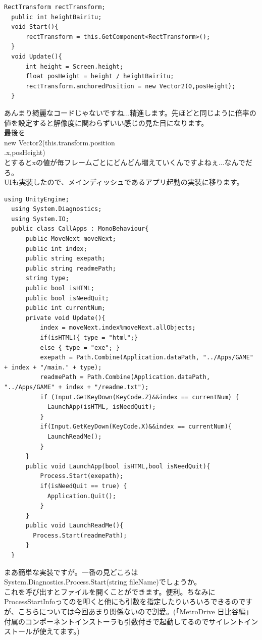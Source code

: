 \documentclass[b5paper,9pt,platex,dvipdfmx]{jsarticle}
\begin{document}
\begin{multicols*}{3}
\begin{lstlisting}[caption=SetInfoTex.cs]
  RectTransform rectTransform;
  public int heightBairitu;
  void Start(){
      rectTransform = this.GetComponent<RectTransform>();
  }
  void Update(){
      int height = Screen.height;
      float posHeight = height / heightBairitu;
      rectTransform.anchoredPosition = new Vector2(0,posHeight);
  }
\end{lstlisting}
あんまり綺麗なコードじゃないですね...精進します。先ほどと同じように倍率の値を設定すると解像度に関わらずいい感じの見た目になります。\\
最後を\\new Vector2(this.transform.position\\.x,posHeight)\\
とするとxの値が毎フレームごとにどんどん増えていくんですよねぇ...なんでだろ。\\
UIも実装したので、メインディッシュであるアプリ起動の実装に移ります。\\
\begin{lstlisting}[caption=CallApps.cs]
  using UnityEngine;
  using System.Diagnostics;
  using System.IO;
  public class CallApps : MonoBehaviour{
      public MoveNext moveNext;
      public int index;
      public string exepath;
      public string readmePath;
      string type;
      public bool isHTML;
      public bool isNeedQuit;
      public int currentNum;
      private void Update(){
          index = moveNext.index%moveNext.allObjects;
          if(isHTML){ type = "html";}
          else { type = "exe"; }
          exepath = Path.Combine(Application.dataPath, "../Apps/GAME" + index + "/main." + type);
          readmePath = Path.Combine(Application.dataPath, "../Apps/GAME" + index + "/readme.txt");
          if (Input.GetKeyDown(KeyCode.Z)&&index == currentNum) {
            LaunchApp(isHTML, isNeedQuit);
          }
          if(Input.GetKeyDown(KeyCode.X)&&index == currentNum){
            LaunchReadMe();
          }
      }
      public void LaunchApp(bool isHTML,bool isNeedQuit){
          Process.Start(exepath);
          if(isNeedQuit == true) {
            Application.Quit();
          }
      }
      public void LaunchReadMe(){
        Process.Start(readmePath);
      }
  }
\end{lstlisting}
まあ簡単な実装ですが。一番の見どころはSystem.Diagnostics.Process.Start(string fileName)でしょうか。\\
これを呼び出すとファイルを開くことができます。便利。ちなみにProcessStartInfoってのを叩くと他にも引数を指定したりいろいろできるのですが、こちらについては今回あまり関係ないので割愛。(「MetroDrive 日比谷編」付属のコンポーネントインストーラも引数付きで起動してるのでサイレントインストールが使えてます。)\\

\end{multicols*}
\end{document}
